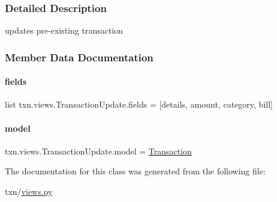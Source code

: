 \subsubsection{Detailed Description}
updates pre-\/existing transaction 

\subsubsection{Member Data Documentation}
\mbox{\label{classtxn_1_1views_1_1TransactionUpdate_aede0ebc5dc84edb5de207888bfbb71fe}} 
\paragraph{\texorpdfstring{fields}{fields}}
{\footnotesize\ttfamily list txn.\+views.\+Transaction\+Update.\+fields = \mbox{[}\textquotesingle{}details\textquotesingle{}, \textquotesingle{}amount\textquotesingle{}, \textquotesingle{}category\textquotesingle{}, \textquotesingle{}bill\textquotesingle{}\mbox{]}\hspace{0.3cm}{\ttfamily [static]}}

\mbox{\label{classtxn_1_1views_1_1TransactionUpdate_a72a12aa6485a035b722cacad8771ca8a}} 
\paragraph{\texorpdfstring{model}{model}}
{\footnotesize\ttfamily txn.\+views.\+Transaction\+Update.\+model = \hyperlink{classtxn_1_1models_1_1Transaction}{Transaction}\hspace{0.3cm}{\ttfamily [static]}}



The documentation for this class was generated from the following file\+:\begin{DoxyCompactItemize}
\item 
txn/\hyperlink{txn_2views_8py}{views.\+py}\end{DoxyCompactItemize}
